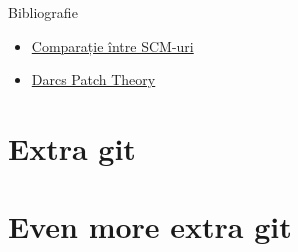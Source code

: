 \documentclass{beamer}
\begin{document}
\begin{frame}{Bibliografie}
  \begin{itemize}
    \item \href{http://en.wikipedia.org/wiki/Comparison_of_revision_control_software}{Comparație între SCM-uri}
    \item \href{http://en.wikibooks.org/wiki/Understanding_Darcs/Patch_theory}{Darcs Patch Theory}
  \end{itemize}
\end{frame}

\section{Extra git}
\section{Even more extra git}


%

%
\end{document}
